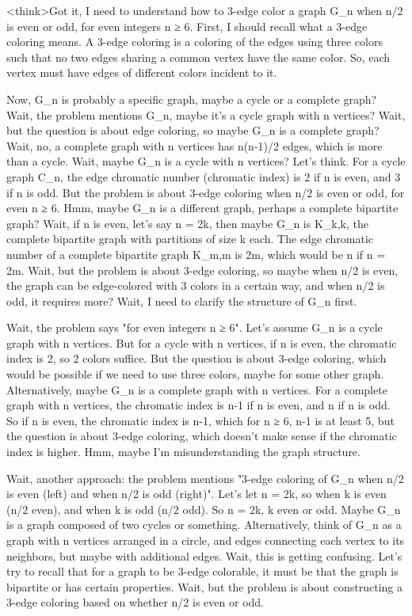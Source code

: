 <think>Got it, I need to understand how to 3-edge color a graph G_n when n/2 is even or odd, for even integers n ≥ 6. First, I should recall what a 3-edge coloring means. A 3-edge coloring is a coloring of the edges using three colors such that no two edges sharing a common vertex have the same color. So, each vertex must have edges of different colors incident to it.

Now, G_n is probably a specific graph, maybe a cycle or a complete graph? Wait, the problem mentions G_n, maybe it's a cycle graph with n vertices? Wait, but the question is about edge coloring, so maybe G_n is a complete graph? Wait, no, a complete graph with n vertices has n(n-1)/2 edges, which is more than a cycle. Wait, maybe G_n is a cycle with n vertices? Let's think. For a cycle graph C_n, the edge chromatic number (chromatic index) is 2 if n is even, and 3 if n is odd. But the problem is about 3-edge coloring when n/2 is even or odd, for even n ≥ 6. Hmm, maybe G_n is a different graph, perhaps a complete bipartite graph? Wait, if n is even, let's say n = 2k, then maybe G_n is K_{k,k}, the complete bipartite graph with partitions of size k each. The edge chromatic number of a complete bipartite graph K_{m,m} is 2m, which would be n if n = 2m. Wait, but the problem is about 3-edge coloring, so maybe when n/2 is even, the graph can be edge-colored with 3 colors in a certain way, and when n/2 is odd, it requires more? Wait, I need to clarify the structure of G_n first.

Wait, the problem says "for even integers n ≥ 6". Let's assume G_n is a cycle graph with n vertices. But for a cycle with n vertices, if n is even, the chromatic index is 2, so 2 colors suffice. But the question is about 3-edge coloring, which would be possible if we need to use three colors, maybe for some other graph. Alternatively, maybe G_n is a complete graph with n vertices. For a complete graph with n vertices, the chromatic index is n-1 if n is even, and n if n is odd. So if n is even, the chromatic index is n-1, which for n ≥ 6, n-1 is at least 5, but the question is about 3-edge coloring, which doesn't make sense if the chromatic index is higher. Hmm, maybe I'm misunderstanding the graph structure.

Wait, another approach: the problem mentions "3-edge coloring of G_n when n/2 is even (left) and when n/2 is odd (right)". Let's let n = 2k, so when k is even (n/2 even), and when k is odd (n/2 odd). So n = 2k, k even or odd. Maybe G_n is a graph composed of two cycles or something. Alternatively, think of G_n as a graph with n vertices arranged in a circle, and edges connecting each vertex to its neighbors, but maybe with additional edges. Wait, this is getting confusing. Let's try to recall that for a graph to be 3-edge colorable, it must be that the graph is bipartite or has certain properties. Wait, but the problem is about constructing a 3-edge coloring based on whether n/2 is even or odd.

